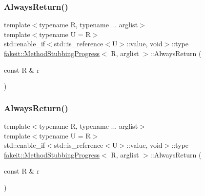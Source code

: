 \subsubsection{\texorpdfstring{AlwaysReturn()}{AlwaysReturn()}\hspace{0.1cm}{\footnotesize\ttfamily [8/27]}}
{\footnotesize\ttfamily template$<$typename R, typename ... arglist$>$ \\
template$<$typename U  = R$>$ \\
std\+::enable\+\_\+if$<$std\+::is\+\_\+reference$<$U$>$\+::value, void$>$\+::type \mbox{\hyperlink{structfakeit_1_1MethodStubbingProgress}{fakeit\+::\+Method\+Stubbing\+Progress}}$<$ R, arglist $>$\+::Always\+Return (\begin{DoxyParamCaption}\item[{const R \&}]{r }\end{DoxyParamCaption})\hspace{0.3cm}{\ttfamily [inline]}}

\mbox{\label{structfakeit_1_1MethodStubbingProgress_a84cf6a4bf307cf8d49efb69b014e9b11}} 
\subsubsection{\texorpdfstring{AlwaysReturn()}{AlwaysReturn()}\hspace{0.1cm}{\footnotesize\ttfamily [9/27]}}
{\footnotesize\ttfamily template$<$typename R, typename ... arglist$>$ \\
template$<$typename U  = R$>$ \\
std\+::enable\+\_\+if$<$std\+::is\+\_\+reference$<$U$>$\+::value, void$>$\+::type \mbox{\hyperlink{structfakeit_1_1MethodStubbingProgress}{fakeit\+::\+Method\+Stubbing\+Progress}}$<$ R, arglist $>$\+::Always\+Return (\begin{DoxyParamCaption}\item[{const R \&}]{r }\end{DoxyParamCaption})\hspace{0.3cm}{\ttfamily [inline]}}

\mbox{\label{structfakeit_1_1MethodStubbingProgress_a3f1ecf87f8c73b7f3276786914579f8b}} 
